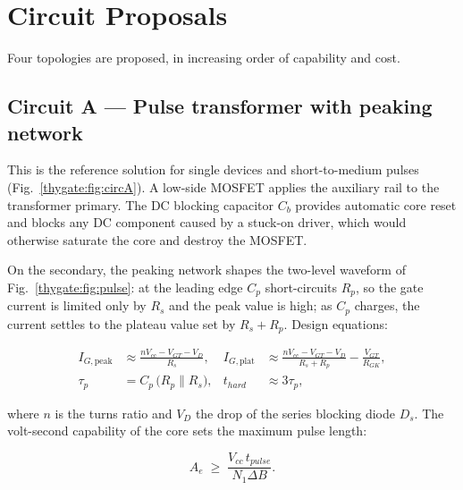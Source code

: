 \section{Circuit Proposals}

Four topologies are proposed, in increasing order of capability and cost.

\subsection{Circuit A --- Pulse transformer with peaking network}

This is the reference solution for single devices and short-to-medium pulses
(Fig.~\ref{thygate:fig:circA}). A low-side MOSFET applies the auxiliary rail to the
transformer primary. The DC blocking capacitor $C_b$ provides automatic core reset
and blocks any DC component caused by a stuck-on driver, which would otherwise
saturate the core and destroy the MOSFET.

On the secondary, the peaking network shapes the two-level waveform of
Fig.~\ref{thygate:fig:pulse}: at the leading edge $C_p$ short-circuits $R_p$, so the gate
current is limited only by $R_s$ and the peak value is high; as $C_p$ charges, the
current settles to the plateau value set by $R_s + R_p$. Design equations:

\begin{align}
  I_{G,\text{peak}} &\approx \frac{n V_{cc} - V_{GT} - V_{D}}{R_s},
  &
  I_{G,\text{plat}} &\approx \frac{n V_{cc} - V_{GT} - V_{D}}{R_s + R_p}
      - \frac{V_{GT}}{R_{GK}},
  \label{thygate:eq:peak}\\[1mm]
  \tau_p &= C_p\,\big(R_p \parallel R_s\big),
  &
  t_{hard} &\approx 3\tau_p ,
\end{align}

where $n$ is the turns ratio and $V_D$ the drop of the series blocking diode $D_s$.
The volt-second capability of the core sets the maximum pulse length:

\begin{equation}
  A_e \;\ge\; \frac{V_{cc}\, t_{pulse}}{N_1 \Delta B}.
  \label{thygate:eq:volt-sec}
\end{equation}


